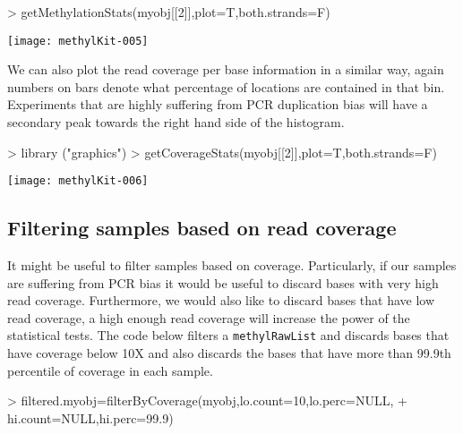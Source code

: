 \documentclass{article}
\begin{document}
\begin{center}
\begin{Schunk}
\begin{Sinput}
> getMethylationStats(myobj[[2]],plot=T,both.strands=F)
\end{Sinput}
\end{Schunk}
\texttt{[image: methylKit-005]}
\end{center}



We can also plot the read coverage per base information in a similar way, again numbers on bars denote what percentage of locations are contained in that bin. Experiments that are highly suffering from PCR duplication bias will have a secondary peak towards the right hand side of the histogram.


\begin{center}
\begin{Schunk}
\begin{Sinput}
> library ("graphics")
> getCoverageStats(myobj[[2]],plot=T,both.strands=F)
\end{Sinput}
\end{Schunk}
\texttt{[image: methylKit-006]}
\end{center}

\subsection{Filtering samples based on read coverage}
It might be useful to filter samples based on coverage. Particularly, if our samples are suffering from PCR bias it would be useful to discard bases with very high read coverage. Furthermore, we would also like to discard bases that have low read coverage, a high enough read coverage will increase the power of the statistical tests. The code below filters a \texttt{methylRawList} and discards bases that have coverage below 10X and also discards the bases that have more than 99.9th percentile of coverage in each sample.

\begin{Schunk}
\begin{Sinput}
> filtered.myobj=filterByCoverage(myobj,lo.count=10,lo.perc=NULL,
+                                       hi.count=NULL,hi.perc=99.9)
\end{Sinput}
\end{Schunk}
\end{document}
